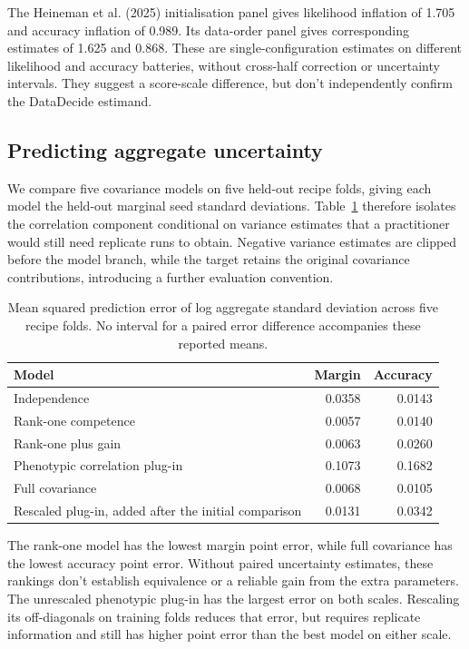 \documentclass{article}
\begin{document}
The Heineman et al. (2025) initialisation panel gives likelihood inflation of 1.705 and accuracy inflation of 0.989. Its data-order panel gives corresponding estimates of 1.625 and 0.868. These are single-configuration estimates on different likelihood and accuracy batteries, without cross-half correction or uncertainty intervals. They suggest a score-scale difference, but don't independently confirm the DataDecide estimand.

\subsection{Predicting aggregate uncertainty}
We compare five covariance models on five held-out recipe folds, giving each model the held-out marginal seed standard deviations. Table~\ref{tab:prediction} therefore isolates the correlation component conditional on variance estimates that a practitioner would still need replicate runs to obtain. Negative variance estimates are clipped before the model branch, while the target retains the original covariance contributions, introducing a further evaluation convention.

\begin{table}[t]
\centering
\caption{Mean squared prediction error of log aggregate standard deviation across five recipe folds. No interval for a paired error difference accompanies these reported means.}
\label{tab:prediction}
\begin{tabular}{lrr}
\toprule
Model & Margin & Accuracy\\
\midrule
Independence & 0.0358 & 0.0143\\
Rank-one competence & 0.0057 & 0.0140\\
Rank-one plus gain & 0.0063 & 0.0260\\
Phenotypic correlation plug-in & 0.1073 & 0.1682\\
Full covariance & 0.0068 & 0.0105\\
Rescaled plug-in, added after the initial comparison & 0.0131 & 0.0342\\
\bottomrule
\end{tabular}
\end{table}

The rank-one model has the lowest margin point error, while full covariance has the lowest accuracy point error. Without paired uncertainty estimates, these rankings don't establish equivalence or a reliable gain from the extra parameters. The unrescaled phenotypic plug-in has the largest error on both scales. Rescaling its off-diagonals on training folds reduces that error, but requires replicate information and still has higher point error than the best model on either scale.
\end{document}
